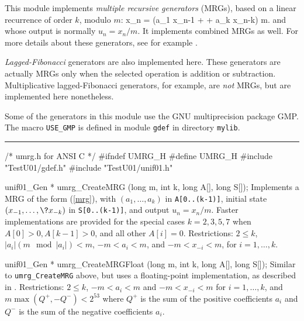 
This module implements {\em multiple recursive generators\/} (MRGs),
based on a linear recurrence of order $k$, modulo $m$:
\eq
   x_n = (a_1 x_{n-1} + \cdots + a_k x_{n-k}) \mod m.    
\endeq
and whose output is normally $u_n = x_n / m$.
It implements combined MRGs as well.
For more details about these generators, see for example
\cite {rLEC93a,rLEC94a,rLEC96b,rLEC99b,rLEC00b,rNIE92b}.

{\em Lagged-Fibonacci\/} generators are also implemented here.
These generators are actually MRGs only when the selected operation
is addition or subtraction.
Multiplicative lagged-Fibonacci generators, for example, are {\em not\/}
MRGs, but are implemented here nonetheless.

Some of the generators in this module use the GNU multiprecision package GMP. 
The macro {\tt USE\_GMP} is defined in module {\tt gdef} in directory
{\tt mylib}.

\bigskip
\hrule
\code
\hide
/*  umrg.h  for ANSI C  */
#ifndef UMRG_H
#define UMRG_H
\endhide
#include "TestU01/gdef.h"
#include "TestU01/unif01.h"
\endcode




\code
unif01_Gen * umrg_CreateMRG (long m, int k, long A[], long S[]);
\endcode
  \tab  Implements a MRG of the form (\ref{mrg}), with
   $(a_1,\dots,a_k)$ in {\tt A[0..(k-1)]}, initial state
   $(x_{-1},\dots,\?x_{-k})$ in {\tt S[0..(k-1)]}, and output
   $u_n = x_n / m$.
%
   Faster implementations are provided for the special cases
   $k =2, 3, 5, 7$ when
   $A[0] > 0, A[k-1] > 0$, and all other $A[i] = 0$.
   Restrictions: $2 \le k$, $|a_i| (m \mod |a_i|) < m$,
   $-m < a_i < m$, and $-m < x_{-i} < m$, for $i = 1,\dots,k$.
 \endtab
\code


unif01_Gen * umrg_CreateMRGFloat (long m, int k, long A[], long S[]);
\endcode
  \tab Similar to {\tt umrg\_CreateMRG} above, but uses a floating-point
   implementation, as described in \cite{rLEC99b}.
   Restrictions: $2 \le k$,
   $-m < a_i < m$ and $-m < x_{-i} < m$ for $i = 1,\dots,k$, and
   $m \max (Q^+, -Q^-) < 2^{53}$
   where $Q^+$ is the sum of the positive coefficients $a_i$ 
   and $Q^-$ is the sum of the negative coefficients $a_i$.
 \endtab
\code


